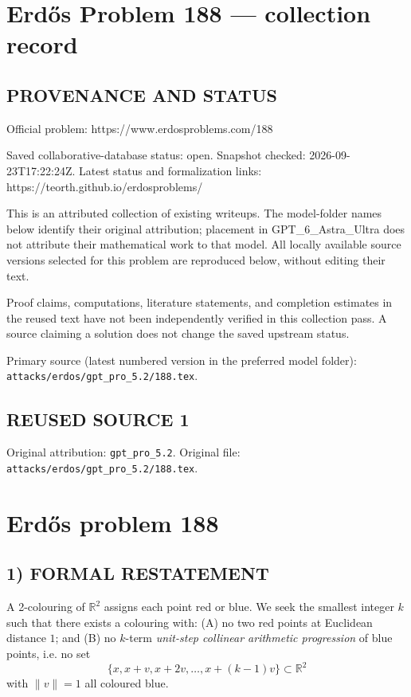 \section*{Erd\H{o}s Problem 188 --- collection record}

\subsection*{PROVENANCE AND STATUS}
Official problem: https://www.erdosproblems.com/188

Saved collaborative-database status: open.
Snapshot checked: 2026-09-23T17:22:24Z.
Latest status and formalization links: https://teorth.github.io/erdosproblems/

This is an attributed collection of existing writeups. The model-folder names below identify their original attribution; placement in GPT\_6\_Astra\_Ultra does not attribute their mathematical work to that model. All locally available source versions selected for this problem are reproduced below, without editing their text.

Proof claims, computations, literature statements, and completion estimates in the reused text have not been independently verified in this collection pass. A source claiming a solution does not change the saved upstream status.

Primary source (latest numbered version in the preferred model folder): \texttt{attacks/erdos/gpt\_pro\_5.2/188.tex}.

\subsection*{REUSED SOURCE 1}
Original attribution: \texttt{gpt\_pro\_5.2}.
Original file: \texttt{attacks/erdos/gpt\_pro\_5.2/188.tex}.

\section*{Erd\H{o}s problem 188}

\subsection*{1) FORMAL RESTATEMENT}
A 2-colouring of $\mathbb{R}^2$ assigns each point red or blue.
We seek the smallest integer $k$ such that there exists a colouring with:
(A) no two red points at Euclidean distance $1$; and
(B) no $k$-term \emph{unit-step collinear arithmetic progression} of blue points, i.e. no set
\[
\{x, x+v, x+2v,\dots,x+(k-1)v\}\subset \mathbb{R}^2
\]
with $\|v\|=1$ all coloured blue.

